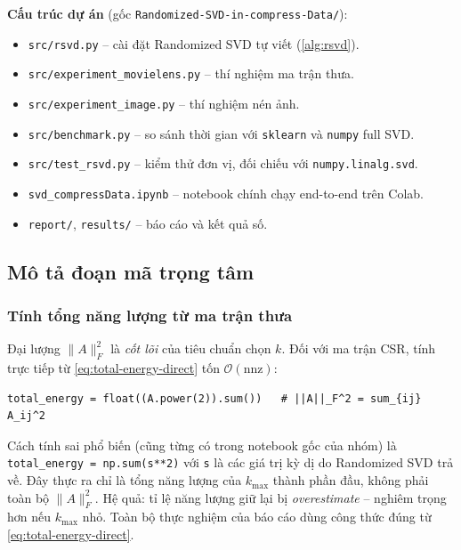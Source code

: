 \textbf{Cấu trúc dự án} (gốc \texttt{Randomized-SVD-in-compress-Data/}):
\begin{itemize}
    \item \texttt{src/rsvd.py} -- cài đặt Randomized SVD tự viết
    (\cref{alg:rsvd}).
    \item \texttt{src/experiment\_movielens.py} -- thí nghiệm ma trận thưa.
    \item \texttt{src/experiment\_image.py} -- thí nghiệm nén ảnh.
    \item \texttt{src/benchmark.py} -- so sánh thời gian với
    \texttt{sklearn} và \texttt{numpy} full SVD.
    \item \texttt{src/test\_rsvd.py} -- kiểm thử đơn vị, đối chiếu với
    \texttt{numpy.linalg.svd}.
    \item \texttt{svd\_compressData.ipynb} -- notebook chính chạy end-to-end
    trên Colab.
    \item \texttt{report/}, \texttt{results/} -- báo cáo và kết quả số.
\end{itemize}

\subsection{Mô tả đoạn mã trọng tâm}\label{subsec:code-walk}

\subsubsection{Tính tổng năng lượng từ ma trận thưa}

Đại lượng $\|A\|_F^2$ là \emph{cốt lõi} của tiêu chuẩn chọn $k$. Đối với ma
trận CSR, tính trực tiếp từ \eqref{eq:total-energy-direct} tốn
$\mathcal{O}(\mathrm{nnz})$:

\begin{lstlisting}[caption={Tính chính xác $\|A\|_F^2$ từ ma trận thưa.}]
total_energy = float((A.power(2)).sum())   # ||A||_F^2 = sum_{ij} A_ij^2
\end{lstlisting}

\begin{remark}
Cách tính sai phổ biến (cũng từng có trong notebook gốc của nhóm) là
\texttt{total\_energy = np.sum(s**2)} với \texttt{s} là các giá trị kỳ dị do
Randomized SVD trả về. Đây thực ra chỉ là tổng năng lượng của $k_{\max}$
thành phần đầu, không phải toàn bộ $\|A\|_F^2$. Hệ quả: tỉ lệ năng lượng giữ
lại bị \emph{overestimate} -- nghiêm trọng hơn nếu $k_{\max}$ nhỏ. Toàn bộ
thực nghiệm của báo cáo dùng công thức đúng từ
\eqref{eq:total-energy-direct}.
\end{remark}

